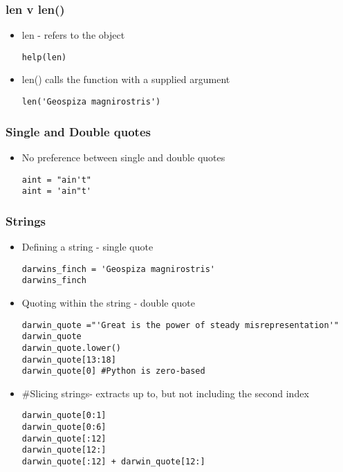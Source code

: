 \documentclass{beamer}
\newcommand\Fontix{\fontsize{9}{8.3}\selectfont}
\begin{document}
\begin{frame}[fragile]
\frametitle{len v len()}
\begin{itemize}
\item len - refers to the object 
\begin{lstlisting}
help(len)
\end{lstlisting}
\item len() calls the function with a supplied argument
\begin{lstlisting}
len('Geospiza magnirostris')
\end{lstlisting}
\end{itemize} 
\end{frame}

\begin{frame}[fragile]
\frametitle{Single and Double quotes}
\begin{itemize}
\item No preference between single and double quotes
\begin{lstlisting}
aint = "ain't"
aint = 'ain"t'
\end{lstlisting}
\end{itemize} 
\end{frame}

\begin{frame}[fragile]
\frametitle{Strings}
\Fontix
\begin{itemize}
\item Defining a string - single quote
\begin{lstlisting}
darwins_finch = 'Geospiza magnirostris'
darwins_finch
\end{lstlisting}
\item Quoting within the string - double quote
\begin{lstlisting}
darwin_quote ="'Great is the power of steady misrepresentation'"
darwin_quote
darwin_quote.lower()
darwin_quote[13:18]
darwin_quote[0] #Python is zero-based
\end{lstlisting}
\item #Slicing strings- extracts up to, but not including the second index
\begin{lstlisting}
darwin_quote[0:1] 
darwin_quote[0:6]
darwin_quote[:12]
darwin_quote[12:]
darwin_quote[:12] + darwin_quote[12:]
\end{lstlisting}
\end{itemize}
\end{frame}
\end{document}
